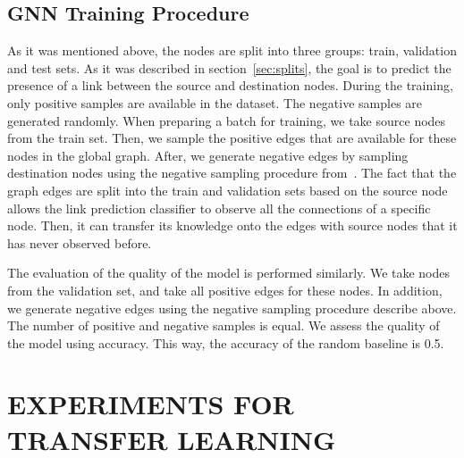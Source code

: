 \documentclass[a4paper,twoside]{article}
\begin{document}
\subsection{GNN Training Procedure}\label{sec:gnn_training}

As it was mentioned above, the nodes are split into three groups: train, validation and test sets. As it was described in section~\ref{sec:splits}, the goal is to predict the presence of a link between the source and destination nodes. During the training, only positive samples are available in the dataset. The negative samples are generated randomly. When preparing a batch for training, we take source nodes from the train set. Then, we sample the positive edges that are available for these nodes in the global graph. After, we generate negative edges by sampling destination nodes using the negative sampling procedure from~\cite{mikolov2013distributed}. The fact that the graph edges are split into the train and validation sets based on the source node allows the link prediction classifier to observe all the connections of a specific node. Then, it can transfer its knowledge onto the edges with source nodes that it has never observed before.

The evaluation of the quality of the model is performed similarly. We take nodes from the validation set, and take all positive edges for these nodes. In addition, we generate negative edges using the negative sampling procedure describe above. The number of positive and negative samples is equal. We assess the quality of the model using accuracy. This way, the accuracy of the random baseline is 0.5.

\section{\uppercase{Experiments for Transfer Learning}}\label{sec:experiments}
\end{document}
